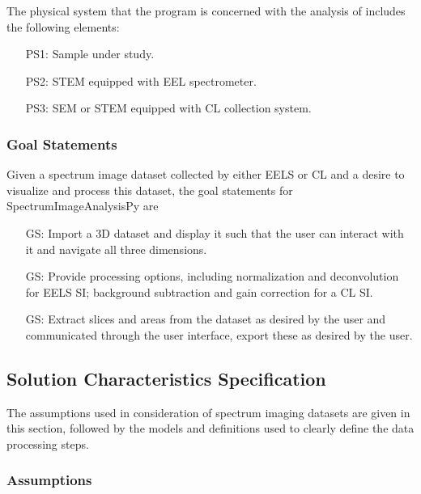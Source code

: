 \documentclass[12pt]{article}
\newcounter{goalnum} %
\newcommand{\progname}{SpectrumImageAnalysisPy} %
\begin{document}
The physical system that the program is concerned with the analysis of includes
the following elements:

\begin{itemize}
	\item[PS1:] Sample under study.
	\item[PS2:] STEM equipped with EEL spectrometer.
	\item[PS3:] SEM or STEM equipped with CL collection system.
\end{itemize}

\subsubsection{Goal Statements}

\noindent Given a spectrum image dataset collected by either EELS or CL and a
desire to visualize and process this dataset, the goal statements for
\progname{} are

\begin{itemize}
	\item[GS\refstepcounter{goalnum}\thegoalnum \label{G_ImportDisplay}:] Import a
3D dataset and display it such that the user can interact with it and navigate
all three dimensions.
	\item[GS\refstepcounter{goalnum}\thegoalnum \label{G_Processing}:] Provide
processing options, including normalization and deconvolution for EELS SI;
background subtraction and gain correction for a CL SI.
	\item[GS\refstepcounter{goalnum}\thegoalnum \label{G_Extraction}:] Extract
slices and areas from the dataset as desired by the user and communicated
through the user interface, export these as desired by the user.
\end{itemize}


\subsection{Solution Characteristics Specification}

The assumptions used in consideration of spectrum imaging datasets are given in
this section, followed by the models and definitions used to clearly define the
data processing steps.

\subsubsection{Assumptions}\label{sssec:Assumptions}
\end{document}
